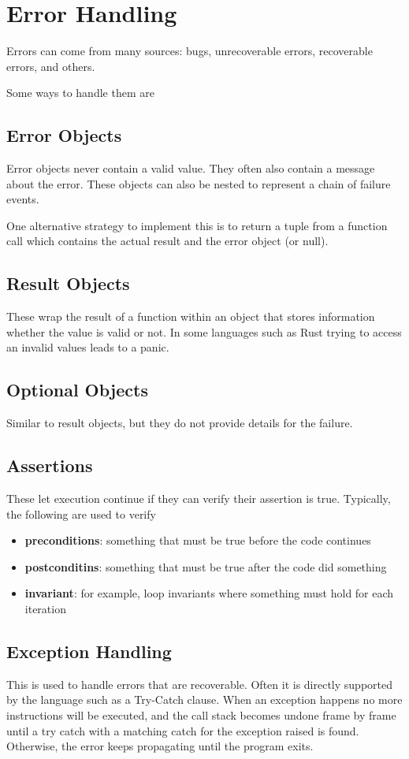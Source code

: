 \section{Error Handling}
Errors can come from many sources: bugs, unrecoverable errors,
recoverable errors, and others.

Some ways to handle them are

\subsection*{Error Objects}
Error objects never contain a valid value. They often also contain a
message about the error. These objects can also be nested to represent a
chain of failure events.

One alternative strategy to implement this is to return a tuple from a
function call which contains the actual result and the error object (or
null).

\subsection*{Result Objects}
These wrap the result of a function within an object that stores
information whether the value is valid or not. In some languages such as
Rust trying to access an invalid values leads to a panic.

\subsection*{Optional Objects}
Similar to result objects, but they do not provide details for the
failure.

\subsection*{Assertions}
These let execution continue if they can verify their assertion is true.
Typically, the following are used to verify
\begin{itemize}
  \item \textbf{preconditions}: something that must be true before the
  code continues
  \item \textbf{postconditins}: something that must be true after the
  code did something
  \item \textbf{invariant}: for example, loop invariants where something
  must hold for each iteration
\end{itemize}

\subsection*{Exception Handling}
This is used to handle errors that are recoverable. Often it is directly
supported by the language such as a Try-Catch clause. When an exception
happens no more instructions will be executed, and the call stack
becomes undone frame by frame until a try catch with a matching catch
for the exception raised is found. Otherwise, the error keeps
propagating until the program exits.

